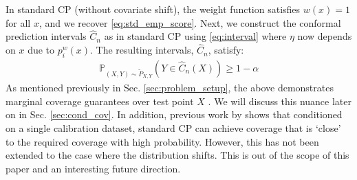 In standard CP (without covariate shift), the weight function satisfies $w(x)=1$ for all $x$, and we recover \eqref{eq:std_emp_score}. Next, we construct the conformal prediction intervals $\hat{C}_n$ as in standard CP using \eqref{eq:interval} where $\eta$ now depends on $x$ due to $p^w_i(x)$. The resulting intervals, $\hat{C}_n$, satisfy: 
\begin{align*}
     \mathbb{P}_{(X,Y)\sim \tilde{P}_{X, Y}}(Y\in \hat{C}_n(X)) \geq 1-\alpha    
\end{align*}
As mentioned previously in Sec. \ref{sec:problem_setup}, the above demonstrates marginal coverage guarantees over test point $X$ .  We will discuss this nuance later on in Sec. \ref{sec:cond_cov}. In addition, previous work by \citeauthor{vovk2012} shows that conditioned on a single calibration dataset, standard CP can achieve coverage that is `close' to the required coverage with high probability. However, this has not been extended to the case where the distribution shifts. This is out of the scope of this paper and an interesting future direction. 



